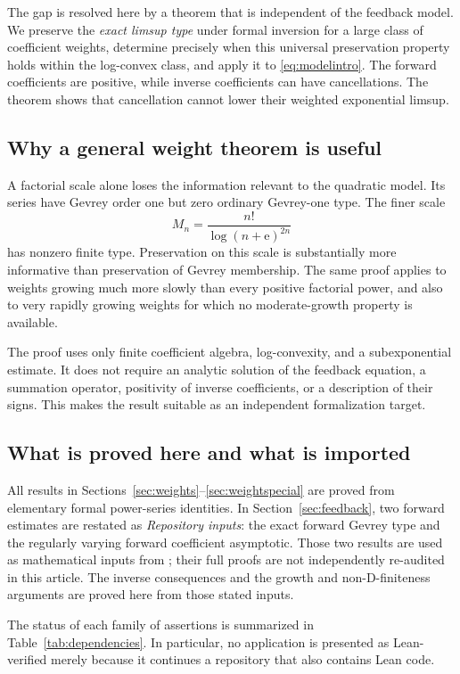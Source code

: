 \documentclass[11pt,a4paper]{article}
\numberwithin{equation}{section}
\theoremstyle{definition}
\theoremstyle{remark}
\newcommand{\ee}{\mathrm e}
\begin{document}
The gap is resolved here by a theorem that is independent of the feedback
model. We preserve the \emph{exact limsup type} under formal inversion for a
large class of coefficient weights, determine precisely when this universal
preservation property holds within the log-convex class, and apply it to
\eqref{eq:modelintro}. The forward coefficients are positive, while inverse
coefficients can have cancellations. The theorem shows that cancellation
cannot lower their weighted exponential limsup.

\subsection{Why a general weight theorem is useful}

A factorial scale alone loses the information relevant to the quadratic
model. Its series have Gevrey order one but zero ordinary Gevrey-one type.
The finer scale
\[
 M_n=\frac{n!}{\log(n+\ee)^{2n}}
\]
has nonzero finite type. Preservation on this scale is substantially more
informative than preservation of Gevrey membership. The same proof applies
to weights growing much more slowly than every positive factorial power,
and also to very rapidly growing weights for which no moderate-growth
property is available.

The proof uses only finite coefficient algebra, log-convexity, and a
subexponential estimate. It does not require an analytic solution of the
feedback equation, a summation operator, positivity of inverse coefficients,
or a description of their signs. This makes the result suitable as an
independent formalization target.

\subsection{What is proved here and what is imported}

All results in Sections~\ref{sec:weights}--\ref{sec:weightspecial} are proved
from elementary formal power-series identities. In
Section~\ref{sec:feedback}, two forward estimates are restated as
\emph{Repository inputs}: the exact forward Gevrey type and the regularly
varying forward coefficient asymptotic. Those two results are used as
mathematical inputs from \cite{feedback};
their full proofs are not independently re-audited in this article.
The inverse consequences and the growth and non-D-finiteness arguments
are proved here from those stated inputs.

The status of each family of assertions is summarized in
Table~\ref{tab:dependencies}. In particular, no application is presented as
Lean-verified merely because it continues a repository that also contains
Lean code.
\end{document}
